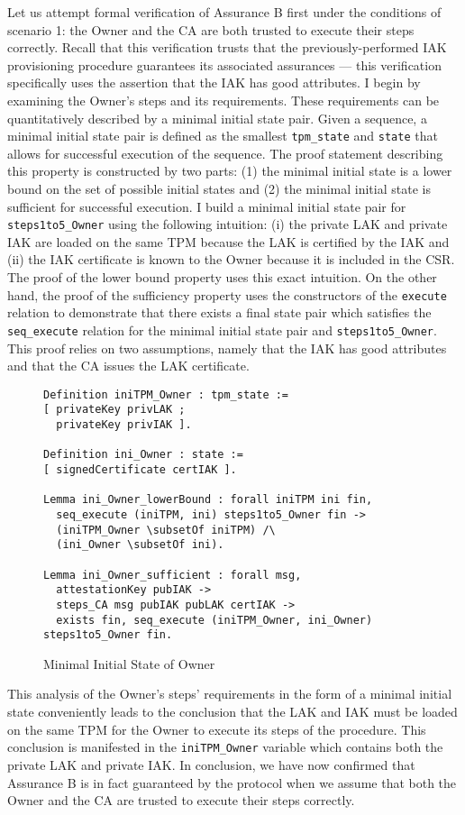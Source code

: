 \documentclass[runningheads]{llncs}
\begin{document}
Let us attempt formal verification of Assurance B first under the conditions of scenario 1: the Owner and the CA are both trusted to execute their steps correctly. Recall that this verification trusts that the previously-performed IAK provisioning procedure guarantees its associated assurances --- this verification specifically uses the assertion that the IAK has good attributes.
I begin by examining the Owner's steps and its requirements. These requirements can be quantitatively described by a minimal initial state pair. Given a sequence, a minimal initial state pair is defined as the smallest \verb|tpm_state| and \verb|state| that allows for successful execution of the sequence. The proof statement describing this property is constructed by two parts: (1) the minimal initial state is a lower bound on the set of possible initial states and (2) the minimal initial state is sufficient for successful execution. I build a minimal initial state pair for \verb|steps1to5_Owner| using the following intuition: (i) the private LAK and private IAK are loaded on the same TPM because the LAK is certified by the IAK and (ii) the IAK certificate is known to the Owner because it is included in the CSR.  
The proof of the lower bound property uses this exact intuition.
On the other hand, the proof of the sufficiency property uses the constructors of the \verb|execute| relation to demonstrate that there exists a final state pair which satisfies the \verb|seq_execute| relation for the minimal initial state pair and \verb|steps1to5_Owner|. This proof relies on two assumptions, namely that the IAK has good attributes and that the CA issues the LAK certificate.

\begin{figure}[hbtp]
\begin{lstlisting}[language=Coq]
Definition iniTPM_Owner : tpm_state :=
[ privateKey privLAK ;
  privateKey privIAK ].

Definition ini_Owner : state :=
[ signedCertificate certIAK ].

Lemma ini_Owner_lowerBound : forall iniTPM ini fin,
  seq_execute (iniTPM, ini) steps1to5_Owner fin ->
  (iniTPM_Owner \subsetOf iniTPM) /\
  (ini_Owner \subsetOf ini).

Lemma ini_Owner_sufficient : forall msg,
  attestationKey pubIAK ->
  steps_CA msg pubIAK pubLAK certIAK ->
  exists fin, seq_execute (iniTPM_Owner, ini_Owner) steps1to5_Owner fin.
\end{lstlisting}
\caption{Minimal Initial State of Owner}
\end{figure}
This analysis of the Owner's steps' requirements in the form of a minimal initial state conveniently leads to the conclusion that the LAK and IAK must be loaded on the same TPM for the Owner to execute its steps of the procedure. This conclusion is manifested in the \verb|iniTPM_Owner| variable which contains both the private LAK and private IAK. In conclusion, we have now confirmed that Assurance B is in fact guaranteed by the protocol when we assume that both the Owner and the CA are trusted to execute their steps correctly.
\end{document}
